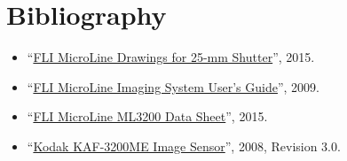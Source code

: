 \section*{Bibliography}

\begin{flushleft}
\begin{itemize}
\item “\href{bibliography/fli-drawing-ml.pdf}{FLI MicroLine Drawings for 25-mm Shutter}”, 2015.
\item “\href{bibliography/fli-ml-users-guide.pdf}{FLI MicroLine Imaging System User’s Guide}”, 2009.
\item “\href{bibliography/fli-ml3200-data-sheet.pdf}{FLI MicroLine ML3200 Data Sheet}”, 2015.
\item “\href{bibliography/kodak-kaf-3200me-data-sheet.pdf}{Kodak KAF-3200ME Image Sensor}”, 2008, Revision 3.0.
\end{itemize}
\end{flushleft}

